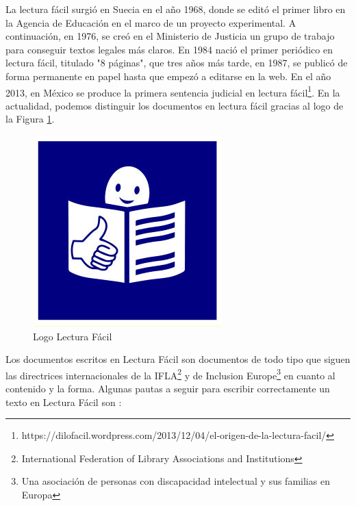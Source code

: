 La lectura fácil surgió en Suecia en el año 1968, donde se editó el primer libro en la Agencia de Educación en el marco de un proyecto experimental. A continuación, en 1976, se creó en el Ministerio de Justicia un grupo de trabajo para conseguir textos legales más claros.
En 1984 nació el primer periódico en lectura fácil, titulado "8 páginas", que tres años más tarde, en 1987, se publicó de forma permanente en papel hasta que empezó a editarse en la web. 
En el año 2013, en México se produce la primera sentencia judicial en lectura fácil\footnote{https://dilofacil.wordpress.com/2013/12/04/el-origen-de-la-lectura-facil/}. En la actualidad, podemos distinguir los documentos en lectura fácil gracias al logo de la Figura \ref{fig:lecturafacil}.

	\begin{figure}[!h]
		\includegraphics[width=.3\textwidth]{Imagenes/Bitmap/Capitulo2/lecturaFacil}
		\centering
		\caption{Logo Lectura Fácil}
		\label{fig:lecturafacil}
	\end{figure}
	
	
Los documentos escritos en Lectura Fácil \citep{lecturafacil} son documentos de todo tipo que siguen las directrices internacionales de la IFLA\footnote{International Federation of Library Associations and Institutions} y de Inclusion Europe\footnote{Una asociación de personas con discapacidad intelectual y sus familias en Europa} en cuanto al contenido y la forma.
Algunas pautas a seguir para escribir correctamente un texto en Lectura Fácil son \citep{GarciaMunoz2012LecturaFacil}:


